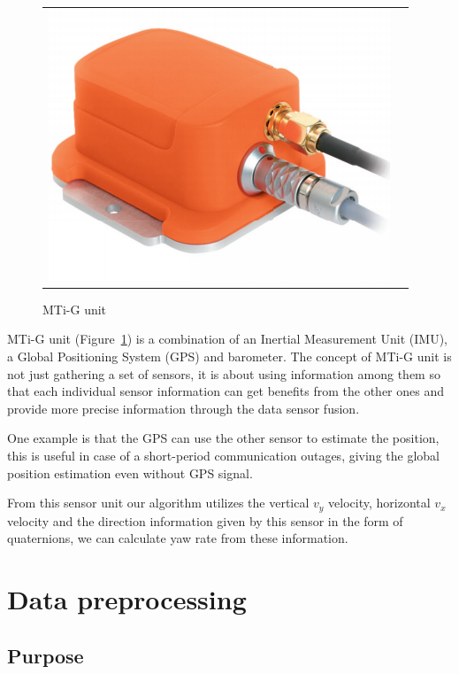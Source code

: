 \begin{figure}[H]
   \centering
     \begin{tabular}{lr}
       \includegraphics[scale=0.3]{img/mti-g}
     \end{tabular}
   \caption{MTi-G unit}
   \label{fig:xsens:mtig}
 \end{figure}

MTi-G unit (Figure~\ref{fig:xsens:mtig}) is a combination of an Inertial Measurement Unit (IMU), a Global Positioning System (GPS) and barometer. The concept of MTi-G unit is not just gathering a set of sensors, it is about using information among them so that each individual sensor information can get benefits from the other ones and provide more precise information through the data sensor fusion.

One example is that the GPS can use the other sensor to estimate the position, this is useful in case of a short-period communication outages, giving the global position estimation even without GPS signal. 

From this sensor unit our algorithm utilizes the vertical $v_y$ velocity, horizontal $v_x$ velocity and the direction information given by this sensor in the form of quaternions, we can calculate yaw rate from these information.%

\section{Data preprocessing} %
\label{sec:sensor:fusion}


\subsection{Purpose}

